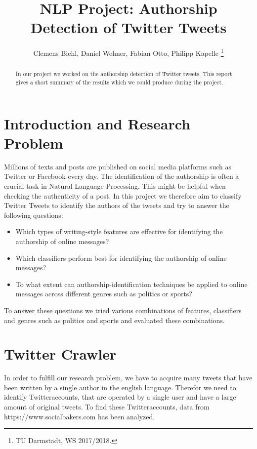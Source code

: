 \documentclass[journal, a4paper, 12pt]{IEEEtran}
\begin{document}
\title{NLP Project: Authorship Detection of Twitter Tweets}
\author{Clemens Biehl, Daniel Wehner, Fabian Otto, Philipp Kapelle
\thanks{TU Darmstadt, WS 2017/2018.}}
\maketitle

\begin{abstract}
In our project we worked on the authorship detection of Twitter tweets. This report gives a short summary of the results which we could produce during the project.
\end{abstract}
	
\section{Introduction and Research Problem}
Millions of texts and posts are published on social media platforms such as Twitter or Facebook every day. The identification of the authorship is often a crucial task in Natural Language Processing. This might be helpful when checking the authenticity of a post. In this project we therefore aim to classify Twitter Tweets to identify the authors of the tweets and try to answer the following questions:
\vspace{-2mm}
\begin{itemize}
\item Which types of writing-style features are effective for identifying the authorship of online messages?
\item Which classifiers perform best for identifying the authorship of online messages?
\item To what extent can authorship-identification techniques be applied to online messages across different genres such as politics or sports?
\end{itemize}
\vspace{-2mm}
To answer these questions we tried various combinations of features, classifiers and genres such as politics and sports and evaluated these combinations.

\section{Twitter Crawler}
In order to fulfill our research problem, we have to acquire many tweets that have been written by a single author in the english language. Therefor we need to identify Twitteraccounts, that are operated by a single user and have a large amount of original tweets. To find these Twitteraccounts, data from https://www.socialbakers.com has been analyzed. 
\end{document}
